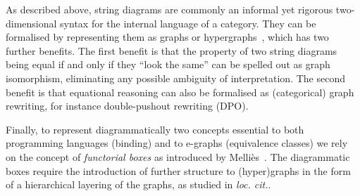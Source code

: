 \documentclass[]{IEEEtran}
\begin{document}
As described above, string diagrams are commonly an informal yet rigorous two-dimensional syntax for the internal language of a category. 
They can be formalised by representing them as graphs or hypergraphs~\cite{https://dl.acm.org/doi/full/10.1145/3502719}, which has two further benefits. 
The first benefit is that the property of two string diagrams being equal if and only if they ``look the same'' can be spelled out as graph isomorphism, eliminating any possible ambiguity of interpretation. 
The second benefit is that equational reasoning can also be formalised as (categorical) graph rewriting, for instance double-pushout rewriting (DPO). 

Finally, to represent diagrammatically two concepts essential to both programming languages (binding) and to e-graphs (equivalence classes) we rely on the concept of \emph{functorial boxes} as introduced by Melli\`es~\cite{https://link.springer.com/chapter/10.1007/11874683_1}. 
The diagrammatic boxes require the introduction of further structure to (hyper)graphs in the form of a hierarchical layering of the graphs, as studied in \emph{loc. cit.}.
\end{document}
